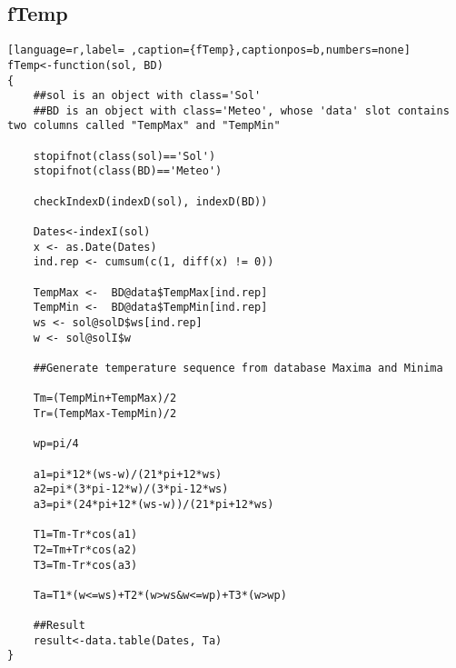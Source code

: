 \subsection{fTemp}
\label{sec:org82b8552}
\label{subsec:ftemp}
\begin{lstlisting}[language=r,label= ,caption={fTemp},captionpos=b,numbers=none]
fTemp<-function(sol, BD)
{
    ##sol is an object with class='Sol'
    ##BD is an object with class='Meteo', whose 'data' slot contains two columns called "TempMax" and "TempMin"

    stopifnot(class(sol)=='Sol')
    stopifnot(class(BD)=='Meteo')

    checkIndexD(indexD(sol), indexD(BD))

    Dates<-indexI(sol)	
    x <- as.Date(Dates)
    ind.rep <- cumsum(c(1, diff(x) != 0))

    TempMax <-  BD@data$TempMax[ind.rep]
    TempMin <-  BD@data$TempMin[ind.rep]
    ws <- sol@solD$ws[ind.rep]
    w <- sol@solI$w

    ##Generate temperature sequence from database Maxima and Minima

    Tm=(TempMin+TempMax)/2
    Tr=(TempMax-TempMin)/2

    wp=pi/4

    a1=pi*12*(ws-w)/(21*pi+12*ws)
    a2=pi*(3*pi-12*w)/(3*pi-12*ws)
    a3=pi*(24*pi+12*(ws-w))/(21*pi+12*ws)

    T1=Tm-Tr*cos(a1)
    T2=Tm+Tr*cos(a2)
    T3=Tm-Tr*cos(a3)

    Ta=T1*(w<=ws)+T2*(w>ws&w<=wp)+T3*(w>wp)

    ##Result
    result<-data.table(Dates, Ta)
}
\end{lstlisting}
